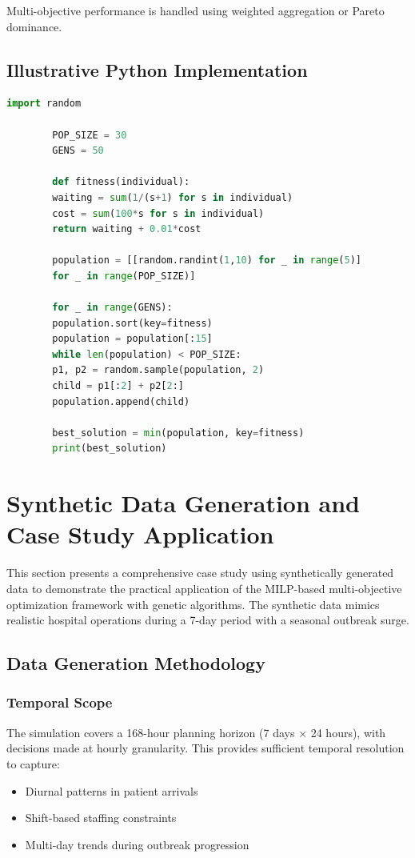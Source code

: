 \documentclass[12pt,a4paper]{article}
\begin{document}
	Multi-objective performance is handled using weighted aggregation or Pareto dominance.
	
	\subsection{Illustrative Python Implementation}
	
	\begin{lstlisting}[language=Python]
		import random
		
		POP_SIZE = 30
		GENS = 50
		
		def fitness(individual):
		waiting = sum(1/(s+1) for s in individual)
		cost = sum(100*s for s in individual)
		return waiting + 0.01*cost
		
		population = [[random.randint(1,10) for _ in range(5)]
		for _ in range(POP_SIZE)]
		
		for _ in range(GENS):
		population.sort(key=fitness)
		population = population[:15]
		while len(population) < POP_SIZE:
		p1, p2 = random.sample(population, 2)
		child = p1[:2] + p2[2:]
		population.append(child)
		
		best_solution = min(population, key=fitness)
		print(best_solution)
	\end{lstlisting}
	
	\section{Synthetic Data Generation and Case Study Application}
	
	This section presents a comprehensive case study using synthetically generated data to demonstrate the practical application of the MILP-based multi-objective optimization framework with genetic algorithms. The synthetic data mimics realistic hospital operations during a 7-day period with a seasonal outbreak surge.
	
	\subsection{Data Generation Methodology}
	
	\subsubsection{Temporal Scope}
	
	The simulation covers a 168-hour planning horizon (7 days × 24 hours), with decisions made at hourly granularity. This provides sufficient temporal resolution to capture:
	\begin{itemize}
		\item Diurnal patterns in patient arrivals
		\item Shift-based staffing constraints
		\item Multi-day trends during outbreak progression
	\end{itemize}
	
\end{document}
